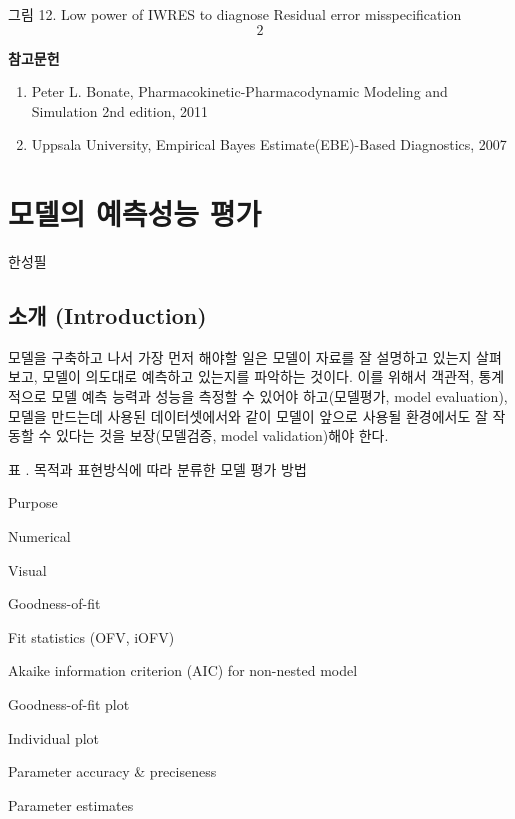 \documentclass[
  10pt,
]{krantz}
\renewenvironment{quote}{\begin{VF}}{\end{VF}}
\begin{document}
그림 12. Low power of IWRES to diagnose Residual error
misspecification\[2\]

\textbf{참고문헌}

\begin{enumerate}
\def\labelenumi{\arabic{enumi}.}
\item
  \begin{quote}
  Peter L. Bonate, Pharmacokinetic-Pharmacodynamic Modeling and
  Simulation 2nd edition, 2011
  \end{quote}
\item
  \begin{quote}
  Uppsala University, Empirical Bayes Estimate(EBE)-Based
  Diagnostics, 2007
  \end{quote}
\end{enumerate}

\hypertarget{evaluation}{%
\chapter{모델의 예측성능 평가}\label{evaluation}}

한성필

\hypertarget{uxc18cuxac1c-introduction}{%
\section{소개 (Introduction)}\label{uxc18cuxac1c-introduction}}

모델을 구축하고 나서 가장 먼저 해야할 일은 모델이 자료를 잘 설명하고 있는지 살펴보고, 모델이 의도대로 예측하고 있는지를 파악하는 것이다. 이를 위해서 객관적, 통계적으로 모델 예측 능력과 성능을 측정할 수 있어야 하고(모델평가, model evaluation), 모델을 만드는데 사용된 데이터셋에서와 같이 모델이 앞으로 사용될 환경에서도 잘 작동할 수 있다는 것을 보장(모델검증, model validation)해야 한다.

표 . 목적과 표현방식에 따라 분류한 모델 평가 방법

Purpose

Numerical

Visual

Goodness-of-fit

Fit statistics (OFV, iOFV)

Akaike information criterion (AIC) for non-nested model

Goodness-of-fit plot

Individual plot

Parameter accuracy \& preciseness

Parameter estimates
\end{document}
